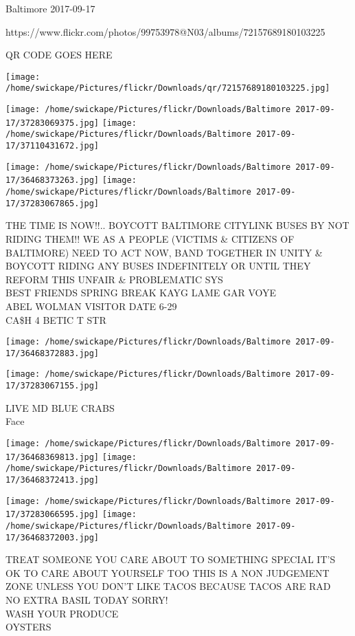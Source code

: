 \documentclass[10pt,letterpaper]{article}
\begin{document}
Baltimore 2017-09-17

https://www.flickr.com/photos/99753978@N03/albums/72157689180103225

QR CODE GOES HERE

\texttt{[image: /home/swickape/Pictures/flickr/Downloads/qr/72157689180103225.jpg]}
\pagebreak

\texttt{[image: /home/swickape/Pictures/flickr/Downloads/Baltimore 2017-09-17/37283069375.jpg]}
\texttt{[image: /home/swickape/Pictures/flickr/Downloads/Baltimore 2017-09-17/37110431672.jpg]}

\texttt{[image: /home/swickape/Pictures/flickr/Downloads/Baltimore 2017-09-17/36468373263.jpg]}
\texttt{[image: /home/swickape/Pictures/flickr/Downloads/Baltimore 2017-09-17/37283067865.jpg]}

THE TIME IS NOW!!..  BOYCOTT BALTIMORE CITYLINK BUSES BY NOT RIDING THEM!!  WE AS A PEOPLE (VICTIMS \& CITIZENS OF BALTIMORE) NEED TO ACT NOW, BAND TOGETHER IN UNITY \& BOYCOTT RIDING ANY BUSES INDEFINITELY OR UNTIL THEY REFORM THIS UNFAIR \& PROBLEMATIC SYS\\
BEST FRIENDS SPRING BREAK KAYG LAME GAR VOYE\\
ABEL WOLMAN VISITOR DATE 6{-}29\\
CA\$H 4 BETIC T STR\\
\pagebreak

\texttt{[image: /home/swickape/Pictures/flickr/Downloads/Baltimore 2017-09-17/36468372883.jpg]}

\vspace{0.25in}
\texttt{[image: /home/swickape/Pictures/flickr/Downloads/Baltimore 2017-09-17/37283067155.jpg]}

LIVE MD BLUE CRABS\\
Face\\
\pagebreak

\texttt{[image: /home/swickape/Pictures/flickr/Downloads/Baltimore 2017-09-17/36468369813.jpg]}
\texttt{[image: /home/swickape/Pictures/flickr/Downloads/Baltimore 2017-09-17/36468372413.jpg]}

\texttt{[image: /home/swickape/Pictures/flickr/Downloads/Baltimore 2017-09-17/37283066595.jpg]}
\texttt{[image: /home/swickape/Pictures/flickr/Downloads/Baltimore 2017-09-17/36468372003.jpg]}

TREAT SOMEONE YOU CARE ABOUT TO SOMETHING SPECIAL IT'S OK TO CARE ABOUT YOURSELF TOO THIS IS A NON JUDGEMENT ZONE UNLESS YOU DON'T LIKE TACOS BECAUSE TACOS ARE RAD\\
NO EXTRA BASIL TODAY SORRY!\\
WASH YOUR PRODUCE\\
OYSTERS\\
\pagebreak
\end{document}

